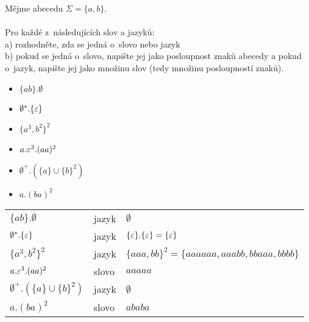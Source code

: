 \documentclass[12pt]{ib102}
\begin{document}
\begin{zadani}
Mějme abecedu $\Sigma = \{a,b\}$. \\
\\
Pro každé z~následujících slov a jazyků: \\
a) rozhodněte, zda se jedná o~slovo nebo jazyk\\
b) pokud se jedná o~slovo, napište jej jako posloupnost znaků abecedy a pokud o~jazyk, napište jej jako množinu slov (tedy množinu posloupností znaků).
\bigskip

\begin{itemize}\itemsep 5ex
    \item[] $\{ab\}.\emptyset$
    \item[] $\emptyset^*.\{\varepsilon\}$
    \item[] $\{a^3,b^2\}^2$
    \item[] $a.\varepsilon^3.(aa)^2$
    \item[] $\emptyset^+.(\{a\} \cup \{b\}^2)$
    \item[] $a.(ba)^2$
\end{itemize}

\end{zadani}

\begin{reseni}
\begin{tabular}{lll}
$\{ab\}.\emptyset $ & jazyk & $ \emptyset$ \\
$\emptyset^*.\{\varepsilon\}$ & jazyk & $\{\varepsilon\}.\{\varepsilon\} = \{\varepsilon\}$ \\
$\{a^3,b^2\}^2$ & jazyk & $\{aaa,bb\}^2 = \{aaaaaa,aaabb,bbaaa,bbbb\}$ \\
$a.\varepsilon^3.(aa)^2$ & slovo & $aaaaa$ \\
$\emptyset^+.(\{a\} \cup \{b\}^2)$ & jazyk & $\emptyset$ \\
$a.(ba)^2$ & slovo & $ababa$ \\
\end{tabular}
\end{reseni}
\end{document}
